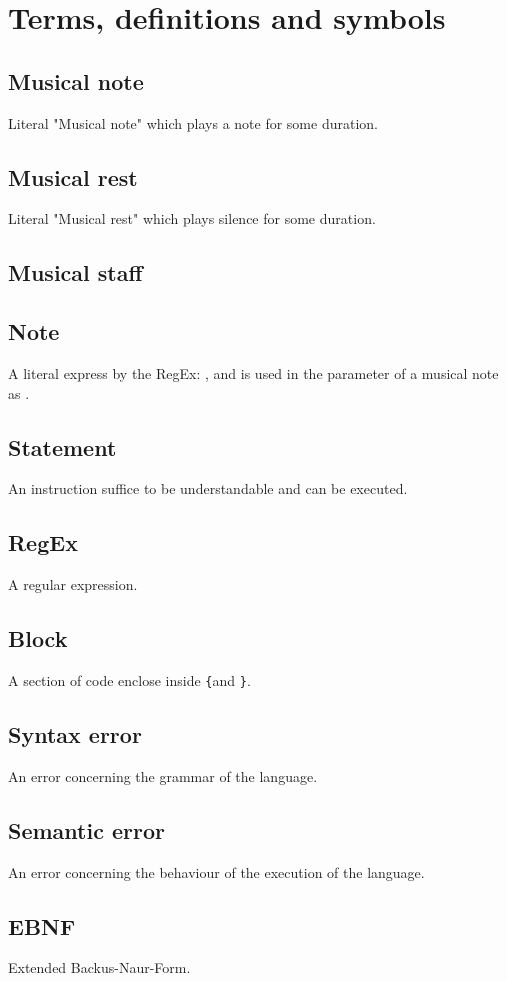 \section{Terms, definitions and symbols}

\subsection{Musical note}

Literal "Musical note" which plays a note for some duration.

\subsection{Musical rest}

Literal "Musical rest" which plays silence for some duration.

\subsection{Musical staff}

\subsection{Note}

A literal express by the RegEx: \protect{}, and is used
in the parameter of a musical note as .

\subsection{Statement}
An instruction suffice to be understandable and can be executed.

\subsection{RegEx}

A regular expression.

\subsection{Block}

A section of code enclose inside \verb+{+and \verb+}+.

\subsection{Syntax error}

An error concerning the grammar of the language.

\subsection{Semantic error}

An error concerning the behaviour of the execution of the language.

\subsection{EBNF}

Extended Backus-Naur-Form.


